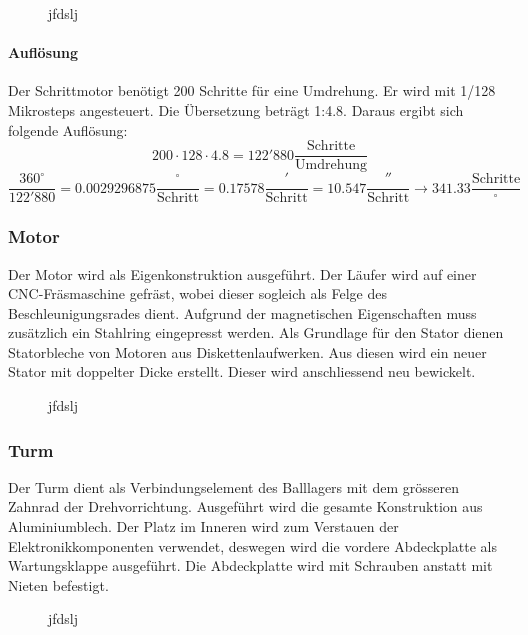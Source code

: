 \begin{figure}[h!]          
	\centering             
	\caption{jfdslj}
	\label{fig:hhjfdhfd}        
\end{figure}

\paragraph{Auflösung}
Der Schrittmotor benötigt 200 Schritte für eine Umdrehung. Er wird mit 1/128 
Mikrosteps angesteuert. Die Übersetzung beträgt 1:4.8. Daraus ergibt sich 
folgende Auflösung: 
\[ 200 \cdot 128 \cdot 4.8 = 122'880 \frac{\text{Schritte}}{\text{Umdrehung}}  \]
\[ \frac{360^\circ}{122'880} = 0.0029296875 \frac{^\circ}{\text{Schritt}} 
= 0.17578 \frac{'}{\text{Schritt}} = 10.547 \frac{''}{\text{Schritt}}
\rightarrow 341.33 \frac{\text{Schritte}}{^\circ}\]

\subsubsection{Motor}
Der Motor wird als Eigenkonstruktion ausgeführt. Der Läufer wird auf einer 
CNC-Fräsmaschine gefräst, wobei dieser sogleich als Felge des 
Beschleunigungsrades dient. Aufgrund der magnetischen Eigenschaften muss 
zusätzlich ein Stahlring eingepresst werden. Als Grundlage für den Stator 
dienen Statorbleche von Motoren aus Diskettenlaufwerken. Aus diesen wird ein 
neuer Stator mit doppelter Dicke erstellt. Dieser wird anschliessend neu 
bewickelt. 

\begin{figure}[h!]          
	\centering             
	\caption{jfdslj}
	\label{fig:hhjfdhfd}        
\end{figure}

\subsubsection{Turm}
Der Turm dient als Verbindungselement des Balllagers mit dem grösseren Zahnrad der Drehvorrichtung. Ausgeführt wird die gesamte Konstruktion aus Aluminiumblech. Der Platz im Inneren wird zum Verstauen der Elektronikkomponenten verwendet, deswegen wird die vordere Abdeckplatte als Wartungsklappe ausgeführt. Die Abdeckplatte wird mit Schrauben anstatt mit Nieten befestigt.

\begin{figure}[h!]          
	\centering             
	\caption{jfdslj}
	\label{fig:hhjfdhfd}        
\end{figure}

\clearpage
